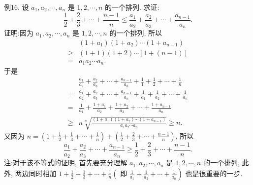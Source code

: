 例16. 设 $a_1, a_2, \cdots, a_n$ 是 $1,2, \cdots, n$ 的一个排列.
求证:
$$
\frac{1}{2}+\frac{2}{3}+\cdots+\frac{n-1}{n} \leqslant \frac{a_1}{a_2}+\frac{a_2}{a_3}+\cdots+\frac{a_{n-1}}{a_n} .
$$
证明:因为 $a_1, a_2, \cdots, a_n$ 是 $1,2, \cdots, n$ 的一个排列, 所以
$$
\begin{aligned}
& \left(1+a_1\right)\left(1+a_2\right) \cdots\left(1+a_{n-1}\right) \\
\geqslant & (1+1)(1+2) \cdots[1+(n-1)] \\
= & a_1 a_2 \cdots a_n .
\end{aligned}
$$
于是
$$
\begin{aligned}
& \frac{a_1}{a_2}+\frac{a_2}{a_3}+\cdots+\frac{a_{n-1}}{a_n}+\frac{1}{1}+\frac{1}{2}+\cdots+\frac{1}{n} \\
= & \frac{a_1}{a_2}+\frac{a_2}{a_3}+\cdots+\frac{a_{n-1}}{a_n}+\frac{1}{a_1}+\frac{1}{a_2}+\cdots+\frac{1}{a_n} \\
= & \frac{1}{a_1}+\frac{1+a_1}{a_2}+\frac{1+a_2}{a_3}+\cdots+\frac{1+a_{n-1}}{a_n} \\
\geqslant & n \sqrt[n]{\frac{\left(1+a_1\right)\left(1+a_2\right) \cdots\left(1+a_{n-1}\right)}{a_1 a_2 \cdots a_n}} \geqslant n .
\end{aligned}
$$
又因为 $n=\left(1+\frac{1}{2}+\frac{1}{3}+\cdots+\frac{1}{n}\right)+\left(\frac{1}{2}+\frac{2}{3}+\cdots+\frac{n-1}{n}\right)$, 所以
$$
\frac{a_1}{a_2}+\frac{a_2}{a_3}+\cdots+\frac{a_{n-1}}{a_n} \geqslant \frac{1}{2}+\frac{2}{3}+\cdots+\frac{n-1}{n} .
$$
注:对于该不等式的证明, 首先要充分理解 $a_1, a_2, \cdots, a_n$ 是 $1,2, \cdots, n$ 的一个排列, 此外, 两边同时相加 $1+\frac{1}{2}+\frac{1}{3}+\cdots+\frac{1}{n}\left(\right.$ 即 $\left.\frac{1}{a_1}+\frac{1}{a_2}+\cdots+\frac{1}{a_n}\right)$ 也是很重要的一步.



